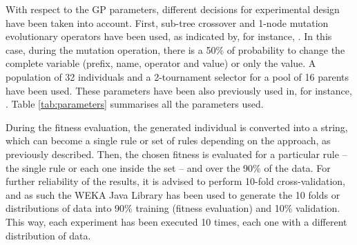 \documentclass[runningheads]{llncs}
\begin{document}
With respect to the GP parameters, different decisions for experimental design have been taken into account. 
First, sub-tree crossover and 1-node mutation evolutionary operators have
been used, as indicated by, for instance, \cite{EvoStar2014:GPBot}. In this case, during the
mutation operation, there is a 50\% of probability to change the complete variable (prefix, name, operator and value) or only the value. A population of 32 individuals and a 2-tournament selector for a pool of
16 parents have been used. These parameters have been also previously
used in, for instance, \cite{EvoStar2014:GPBot}. Table \ref{tab:parameters} summarises all the parameters used.
%
\begin{table}
\begin{center}
\caption{Parameters used in the experiments.}
\label{tab:parameters}
\end{center}
\end{table}

During the fitness evaluation, the generated individual is converted
into a string, which can become a single rule or set of rules
depending on the approach, as previously described. %
Then, the chosen fitness is evaluated for a particular rule -- the single rule or each one inside the set -- and over the 90\% of the data.
For further reliability of the results, it is advised to perform
10-fold cross-validation, and as such the WEKA 
Java Library \cite{HallWEKA09} has been used to generate the 10 folds
or distributions of data into 90\% training (fitness evaluation) and
10\% validation. This way, each experiment has been executed 10 times,
each one with a different distribution of data.
\end{document}
